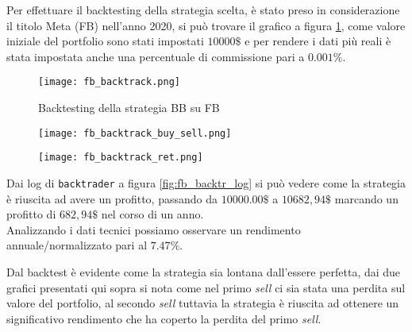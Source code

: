 Per effettuare il backtesting della strategia scelta, è stato preso in considerazione il titolo Meta (FB) nell'anno
2020, si può trovare il grafico a figura \ref{fig:fb_backtest}, come valore iniziale del portfolio sono stati impostati
$10000\$$ e per rendere i dati più reali è stata impostata anche una percentuale di commissione pari a $0.001\%$.

\begin{figure}[ht]
    \centering
    \texttt{[image: fb\_backtrack.png]}
    \caption{Backtesting della strategia BB su FB}
    \label{fig:fb_backtest}
\end{figure}

\begin{figure}[ht]
    \centering
    \begin{minipage}{.5\textwidth}
        \centering
        \vspace{2.35cm}
        \texttt{[image: fb\_backtrack\_buy\_sell.png]}
        \label{fig:fb_backtr_log}
    \end{minipage}%
    \begin{minipage}{.5\textwidth}
        \centering
        \texttt{[image: fb\_backtrack\_ret.png]}
        \label{fig:fb_backtr_ret}
    \end{minipage}
\end{figure}

Dai log di \verb|backtrader| a figura \ref{fig:fb_backtr_log} si può vedere come la strategia è riuscita ad avere un profitto,
passando da $10000.00\$$ a $10682,94\$$ marcando un profitto di $682,94\$$ nel corso di un anno.\\
Analizzando i dati tecnici possiamo osservare un rendimento annuale/normalizzato pari al $7.47\%$.

Dal backtest è evidente come la strategia sia lontana dall'essere perfetta, dai due grafici presentati qui sopra si nota come nel
primo \emph{sell} ci sia stata una perdita sul valore del portfolio, al secondo \emph{sell} tuttavia la strategia è riuscita ad ottenere
un significativo rendimento che ha coperto la perdita del primo \emph{sell}.

\pagebreak